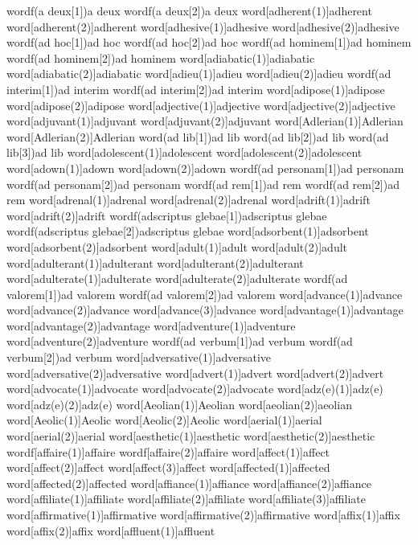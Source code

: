 wordf(a deux[1]){a deux}
wordf(a deux[2]){a deux}
word[adherent(1)]{adherent}
word[adherent(2)]{adherent}
word[adhesive(1)]{adhesive}
word[adhesive(2)]{adhesive}
wordf(ad hoc[1]){ad hoc}
wordf(ad hoc[2]){ad hoc}
wordf(ad hominem[1]){ad hominem}
wordf(ad hominem[2]){ad hominem}
word[adiabatic(1)]{adiabatic}
word[adiabatic(2)]{adiabatic}
word[adieu(1)]{adieu}
word[adieu(2)]{adieu}
wordf(ad interim[1]){ad interim}
wordf(ad interim[2]){ad interim}
word[adipose(1)]{adipose}
word[adipose(2)]{adipose}
word[adjective(1)]{adjective}
word[adjective(2)]{adjective}
word[adjuvant(1)]{adjuvant}
word[adjuvant(2)]{adjuvant}
word[Adlerian(1)]{Adlerian}
word[Adlerian(2)]{Adlerian}
word(ad lib[1]){ad lib}
word(ad lib[2]){ad lib}
word(ad lib[3]){ad lib}
word[adolescent(1)]{adolescent}
word[adolescent(2)]{adolescent}
word[adown(1)]{adown}
word[adown(2)]{adown}
wordf(ad personam[1]){ad personam}
wordf(ad personam[2]){ad personam}
wordf(ad rem[1]){ad rem}
wordf(ad rem[2]){ad rem}
word[adrenal(1)]{adrenal}
word[adrenal(2)]{adrenal}
word[adrift(1)]{adrift}
word[adrift(2)]{adrift}
wordf(adscriptus glebae[1]){adscriptus glebae}
wordf(adscriptus glebae[2]){adscriptus glebae}
word[adsorbent(1)]{adsorbent}
word[adsorbent(2)]{adsorbent}
word[adult(1)]{adult}
word[adult(2)]{adult}
word[adulterant(1)]{adulterant}
word[adulterant(2)]{adulterant}
word[adulterate(1)]{adulterate}
word[adulterate(2)]{adulterate}
wordf(ad valorem[1]){ad valorem}
wordf(ad valorem[2]){ad valorem}
word[advance(1)]{advance}
word[advance(2)]{advance}
word[advance(3)]{advance}
word[advantage(1)]{advantage}
word[advantage(2)]{advantage}
word[adventure(1)]{adventure}
word[adventure(2)]{adventure}
wordf(ad verbum[1]){ad verbum}
wordf(ad verbum[2]){ad verbum}
word[adversative(1)]{adversative}
word[adversative(2)]{adversative}
word[advert(1)]{advert}
word[advert(2)]{advert}
word[advocate(1)]{advocate}
word[advocate(2)]{advocate}
word[{adz(e)}(1)]{adz(e)}
word[{adz(e)}(2)]{adz(e)}
word[Aeolian(1)]{Aeolian}
word[aeolian(2)]{aeolian}
word[Aeolic(1)]{Aeolic}
word[Aeolic(2)]{Aeolic}
word[aerial(1)]{aerial}
word[aerial(2)]{aerial}
word[aesthetic(1)]{aesthetic}
word[aesthetic(2)]{aesthetic}
wordf[affaire(1)]{affaire}
wordf[affaire(2)]{affaire}
word[affect(1)]{affect}
word[affect(2)]{affect}
word[affect(3)]{affect}
word[affected(1)]{affected}
word[affected(2)]{affected}
word[affiance(1)]{affiance}
word[affiance(2)]{affiance}
word[affiliate(1)]{affiliate}
word[affiliate(2)]{affiliate}
word[affiliate(3)]{affiliate}
word[affirmative(1)]{affirmative}
word[affirmative(2)]{affirmative}
word[affix(1)]{affix}
word[affix(2)]{affix}
word[affluent(1)]{affluent}
